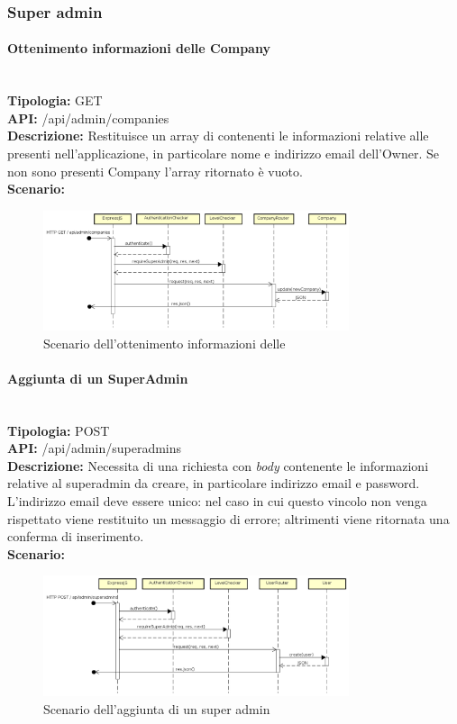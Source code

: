 \newpage
\subsubsection{Super admin}
\paragraph{Ottenimento informazioni delle Company}\mbox{}\\
\textbf{Tipologia:} GET \\
\textbf{API:} /api/admin/companies \\
\textbf{Descrizione:} Restituisce un array di  contenenti le informazioni relative alle  presenti nell'applicazione, in particolare nome e indirizzo email dell'Owner. Se non sono presenti Company l'array ritornato è vuoto. \\
\textbf{Scenario:} 
\begin{figure}[H]
\centering
\includegraphics[width=0.8\textwidth]{res/sections/backend/sequence/(GET)companySA.png}
\caption{Scenario dell'ottenimento informazioni delle }
\end{figure}

\newpage
\paragraph{Aggiunta di un SuperAdmin}\mbox{}\\
\textbf{Tipologia:} POST \\
\textbf{API:} /api/admin/superadmins \\
\textbf{Descrizione:} Necessita di una richiesta con \textit{body} contenente le informazioni relative al superadmin da creare, in particolare indirizzo email e password. L'indirizzo email deve essere unico: nel caso in cui questo vincolo non venga rispettato viene restituito un messaggio di errore; altrimenti viene ritornata una conferma di inserimento. \\
\textbf{Scenario:} 
\begin{figure}[H]
\centering
\includegraphics[width=0.8\textwidth]{res/sections/backend/sequence/(POST)superadmin.png}
\caption{Scenario dell'aggiunta di un super admin}
\end{figure}

